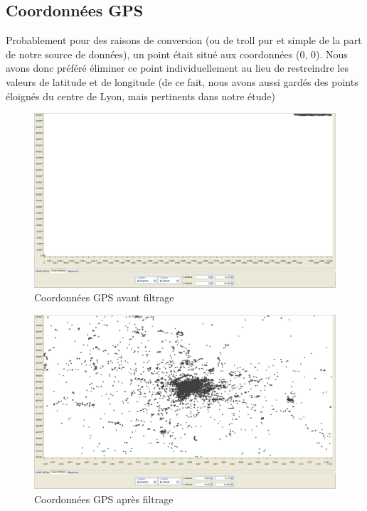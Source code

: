     \pagebreak
    \subsection{Coordonnées GPS}

        Probablement pour des raisons de conversion (ou de troll pur et simple de la part de notre source de données),
        un point était situé aux coordonnées (0, 0). Nous avons donc préféré éliminer ce point individuellement au lieu
        de restreindre les valeurs de latitude et de longitude (de ce fait, nous avons aussi gardés des points éloignés
        du centre de Lyon, mais pertinents dans notre étude)

        \begin{figure}[h]
            \centering
            \includegraphics[scale=0.22]{../screenshots/geographic_before.png}
            \caption{Coordonnées GPS avant filtrage}
            \label{diagram:geographic_before}
        \end{figure}

        \begin{figure}[h]
            \centering
            \includegraphics[scale=0.22]{../screenshots/geographic_after.png}
            \caption{Coordonnées GPS après filtrage}
            \label{diagram:geographic_after}
        \end{figure}

